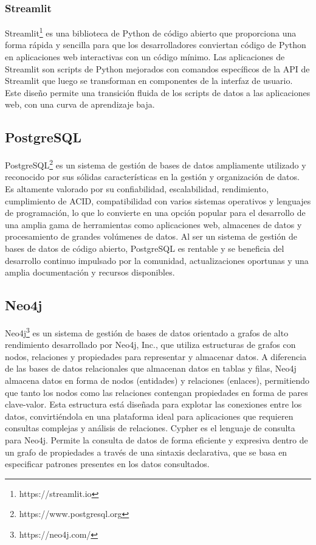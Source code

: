 \subsubsection{Streamlit}

Streamlit\footnote{https://streamlit.io} es una biblioteca de Python de código abierto que proporciona una forma rápida y sencilla para que los 
desarrolladores conviertan c\'odigo de Python en aplicaciones web 
interactivas con un código mínimo. 
Las aplicaciones de Streamlit son scripts de Python mejorados con comandos específicos de la API de Streamlit que luego se 
transforman en componentes de la interfaz de usuario. Este diseño 
permite una transición fluida de los scripts de datos a las aplicaciones web, con una curva de aprendizaje baja.


\subsection{PostgreSQL}

PostgreSQL\footnote{https://www.postgresql.org} es un sistema de gestión de bases de datos ampliamente utilizado y 
reconocido por sus sólidas 
características en la gestión y organización de datos. Es altamente valorado por su confiabilidad, escalabilidad, 
rendimiento, cumplimiento de ACID, compatibilidad con varios sistemas operativos y lenguajes de programación, lo que 
lo convierte en una opción popular para el desarrollo de una amplia gama de herramientas 
como aplicaciones web, 
almacenes de datos y procesamiento de grandes volúmenes de datos. 
Al ser un sistema de gestión de bases de datos de código abierto, PostgreSQL es rentable y se beneficia del 
desarrollo continuo impulsado por la comunidad, actualizaciones oportunas y una amplia documentación y recursos 
disponibles.

\subsection{Neo4j}

Neo4j\footnote{https://neo4j.com/} es un sistema de gestión de bases de datos orientado a grafos de alto rendimiento desarrollado por 
Neo4j, Inc., 
que utiliza estructuras de grafos con nodos, relaciones y propiedades para representar y almacenar datos. A 
diferencia de las bases de datos relacionales que almacenan datos en tablas y filas, Neo4j almacena datos en 
forma de nodos (entidades) y relaciones (enlaces), permitiendo que tanto los nodos como las relaciones contengan 
propiedades en forma de pares clave-valor. Esta estructura está diseñada para explotar las conexiones entre 
los datos, convirtiéndola en una plataforma ideal para aplicaciones que requieren consultas complejas y 
análisis de relaciones. Cypher es el lenguaje de consulta para Neo4j. Permite la consulta de datos de forma eficiente 
y expresiva dentro de un grafo de propiedades a través de 
una sintaxis declarativa, que se basa en especificar patrones presentes en los datos consultados. 

